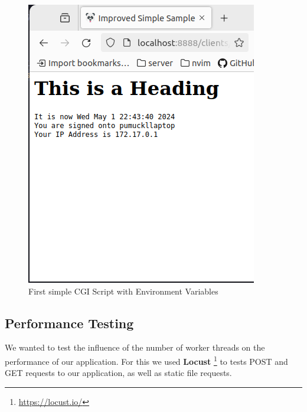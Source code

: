 \begin{figure}[h]
\begin{minipage}{0.35\textwidth}
        \includegraphics[width=\textwidth]{figures/cgi.png}
        \caption{First simple CGI Script with Environment Variables}
    \end{minipage}
\end{figure}
\vspace{-15pt}
\subsection*{Performance Testing}
We wanted to test the influence of the number of worker threads on the performance of our application. For this we used \textbf{Locust} \footnote{\url{https://locust.io/}} to tests POST and GET requests to our application, as well as static file requests. 
